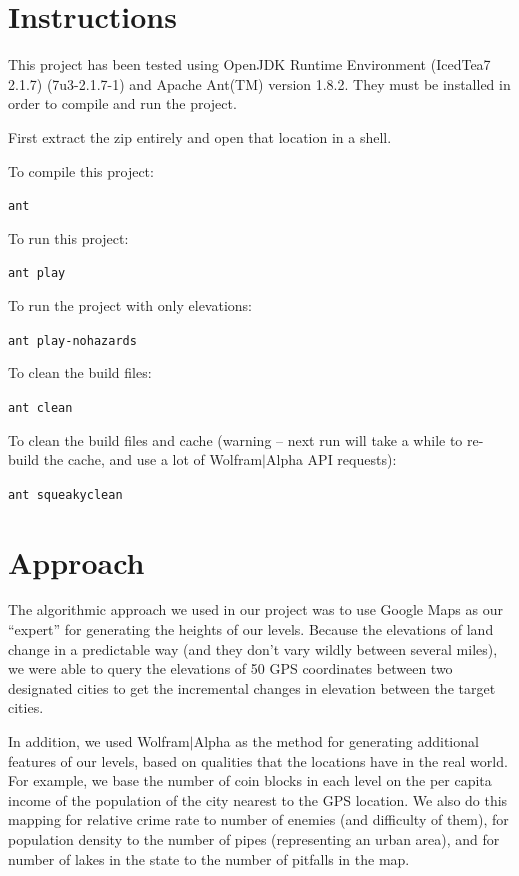 \documentclass[12pt]{article}
\begin{document}
\maketitle
\section{Instructions}

This project has been tested using OpenJDK Runtime Environment (IcedTea7 2.1.7) (7u3-2.1.7-1) and Apache Ant(TM) version 1.8.2.  They must be installed in order to compile and run the project.

First extract the zip entirely and open that location in a shell.

To compile this project:

\texttt{ant}

To run this project:

\texttt{ant play}

To run the project with only elevations:

\texttt{ant play-nohazards}

To clean the build files:

\texttt{ant clean}

To clean the build files and cache (warning -- next run will take a while to re-build the cache, and use a lot of Wolfram$\vert$Alpha API requests):

\texttt{ant squeakyclean}

\section{Approach}

The algorithmic approach we used in our project was to use Google Maps as our ``expert'' for generating the heights of our levels.  Because the elevations of land change in a predictable way (and they don't vary wildly between several miles), we were able to query the elevations of 50 GPS coordinates between two designated cities to get the incremental changes in elevation between the target cities.

In addition, we used Wolfram$\vert$Alpha as the method for generating additional features of our levels, based on qualities that the locations have in the real world.  For example, we base the number of coin blocks in each level on the per capita income of the population of the city nearest to the GPS location.  We also do this mapping for relative crime rate to number of enemies (and difficulty of them), for population density to the number of pipes (representing an urban area), and for number of lakes in the state to the number of pitfalls in the map.
\end{document}

